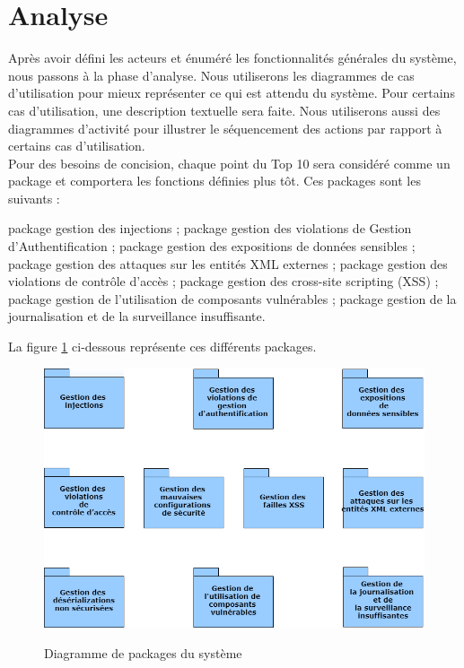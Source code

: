 \section{Analyse}
Après avoir défini les acteurs et énuméré les fonctionnalités générales du système, nous passons à la phase d'analyse. Nous utiliserons les diagrammes de cas d'utilisation pour mieux représenter ce qui est attendu du système. Pour certains cas d'utilisation, une description textuelle sera faite. Nous utiliserons aussi des diagrammes d'activité pour illustrer le séquencement des actions par rapport à certains cas d'utilisation.\\
Pour des besoins de concision, chaque point du Top 10 sera considéré comme un package et comportera les fonctions définies plus tôt. Ces packages sont les suivants :
\begin{itemize}
	\itemtirait package gestion des injections ;
	\itemtirait package gestion des violations de Gestion d’Authentification ;
	\itemtirait package gestion des expositions de données sensibles ;
	\itemtirait package gestion des attaques sur les entités XML externes ;
	\itemtirait package gestion des violations de contrôle d’accès ;
	\itemtirait package gestion des cross-site scripting (XSS) ;
	\itemtirait package gestion de l'utilisation de composants vulnérables ;
	\itemtirait package gestion de la journalisation et de la surveillance insuffisante.
\end{itemize}
La figure \ref{fig:8.1} ci-dessous représente ces différents packages.
\begin{figure}[H]
	\centering
	\begin{minipage}{18cm}
		\centering
		{\includegraphics[height=0.27\textheight]{fig/Package-Diagram.png}}
	\end{minipage}
	\caption{Diagramme de packages du système}
	\label{fig:8.1}
\end{figure}


